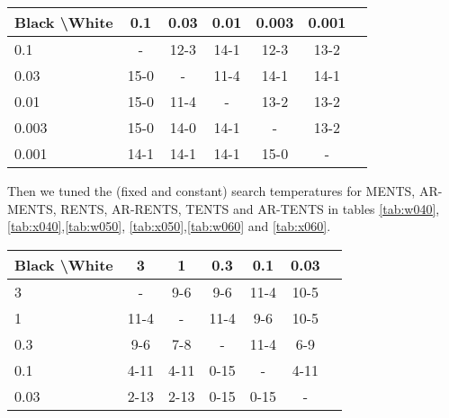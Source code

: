     \begin{table*}[]
    \centering
        \begin{tabular}{l|cccccc}
            \textbf{Black \textbackslash White}     & 0.1  & 0.03   & 0.01   & 0.003    & 0.001    \\ 
            \hline
                                    0.1            & - & 12-3 & 14-1 & 12-3 & 13-2   		\\
                                    0.03            & 15-0 & - & 11-4 & 14-1 & 14-1   		\\
                                    0.01          & 15-0 & 11-4 & - & 13-2 & 13-2   		\\
                                    0.003          & 15-0 & 14-0 & 14-1 & - & 13-2   		\\
                                    0.001         & 14-1 & 14-1 & 14-1 & 15-0 &   -   	\\    
        \end{tabular}
        \caption{Results for round robin to select the exploration parameter $\epsilon$ for AR-BTS. The value of 0.001 won the most matches so was selected. \label{tab:x030}}
    \end{table*}
    
    
    
    
    
    
    
    
    
    Then we tuned the (fixed and constant) search temperatures for MENTS, AR-MENTS, RENTS, AR-RENTS, TENTS and AR-TENTS in tables \ref{tab:w040}, \ref{tab:x040},\ref{tab:w050}, \ref{tab:x050},\ref{tab:w060} and \ref{tab:x060}.
    
    
    
    
    \begin{table*}[]
    \centering
        \begin{tabular}{l|cccccc}
            \textbf{Black \textbackslash White}     & 3  & 1   & 0.3   & 0.1    & 0.03    \\ 
            \hline
                                    3            & -     	&   	9-6	&  9-6 		&   	11-4	&  10-5 		\\
                                    1            & 11-4  		& -     	&  11-4		&  9-6 		& 10-5  		\\
                                    0.3          &  9-6  	&  7-8  	&   -   &  11-4 		&  6-9 		\\
                                    0.1          &  4-11 		&   4-11		&   0-15		& -     	&  4-11 		\\
                                    0.03         &   	2-13	&  2-13 		&  0-15 		&   0-15		&   -   	\\      
        \end{tabular}
        \caption{Results for round robin to select the temperature parameter $\alpha$ for MENTS. The value of 1.0 won the most matches so was selected. \label{tab:w040}}
    \end{table*}
    
